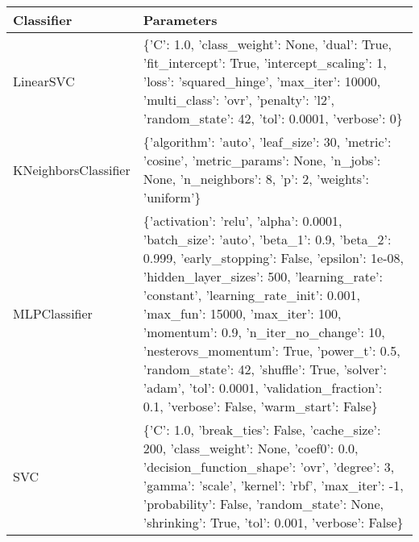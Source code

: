 \begin{tabular}{p{4.3cm}|p{9cm}}
\toprule
            Classifier &                                                                                                                                                                                                                                                                                                                                                                                                                                                                                     Parameters \\
\midrule
             LinearSVC &                                                                                                                                                                                                                                                              \{'C': 1.0, 'class\_weight': None, 'dual': True, 'fit\_intercept': True, 'intercept\_scaling': 1, 'loss': 'squared\_hinge', 'max\_iter': 10000, 'multi\_class': 'ovr', 'penalty': 'l2', 'random\_state': 42, 'tol': 0.0001, 'verbose': 0\} \\
  KNeighborsClassifier &                                                                                                                                                                                                                                                                                                                                              \{'algorithm': 'auto', 'leaf\_size': 30, 'metric': 'cosine', 'metric\_params': None, 'n\_jobs': None, 'n\_neighbors': 8, 'p': 2, 'weights': 'uniform'\} \\
         MLPClassifier & \{'activation': 'relu', 'alpha': 0.0001, 'batch\_size': 'auto', 'beta\_1': 0.9, 'beta\_2': 0.999, 'early\_stopping': False, 'epsilon': 1e-08, 'hidden\_layer\_sizes': 500, 'learning\_rate': 'constant', 'learning\_rate\_init': 0.001, 'max\_fun': 15000, 'max\_iter': 100, 'momentum': 0.9, 'n\_iter\_no\_change': 10, 'nesterovs\_momentum': True, 'power\_t': 0.5, 'random\_state': 42, 'shuffle': True, 'solver': 'adam', 'tol': 0.0001, 'validation\_fraction': 0.1, 'verbose': False, 'warm\_start': False\} \\
                   SVC &                                                                                                                                                                                                        \{'C': 1.0, 'break\_ties': False, 'cache\_size': 200, 'class\_weight': None, 'coef0': 0.0, 'decision\_function\_shape': 'ovr', 'degree': 3, 'gamma': 'scale', 'kernel': 'rbf', 'max\_iter': -1, 'probability': False, 'random\_state': None, 'shrinking': True, 'tol': 0.001, 'verbose': False\} \\

\end{tabular}
